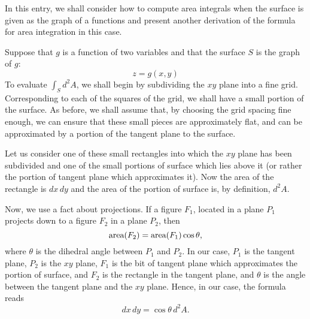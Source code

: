 \documentclass[12pt]{article}
\begin{document}
In this entry, we shall consider how to compute area integrals when the surface is given as the graph of a functions and present another derivation of the formula for area integration in this case.

Suppose that $g$ is a function of two variables and that the surface $S$ is the graph of $g$:
 $$z = g (x,y)$$
To evaluate $\int_S d^2 A$, we shall begin by subdividing the $xy$ plane into a fine grid.  Corresponding to each of the squares of the grid, we shall have a small portion of the surface.  As before, we shall assume that, by choosing the grid spacing fine enough, we can ensure that these small pieces are approximately flat, and can be approximated by a portion of the tangent plane to the surface.

Let us consider one of these small rectangles into which the $xy$ plane has been subdivided and one of the small portions of surface which lies above it (or rather the portion of tangent plane which approximates it).  Now the area of the rectangle is $dx \, dy$ and the area of the portion of surface is, by definition, $d^2 A$.

Now, we use a fact about projections.  If a figure $F_1$, located in a plane $P_1$ projects down to a figure $F_2$ in a plane $P_2$, then
 $$\hbox{area} (F_2) = \hbox{area} (F_1) \cos \theta,$$
where $\theta$ is the dihedral angle between $P_1$ and $P_2$.  In our case, $P_1$ is the tangent plane, $P_2$ is the $xy$ plane, $F_1$ is the bit of tangent plane which approximates the portion of surface, and $F_2$ is the rectangle in the tangent plane, and $\theta$ is the angle between the tangent plane and the $xy$ plane.  Hence, in our case, the formula reads
 $$dx \, dy = \cos \theta \, d^2 A.$$
\end{document}
